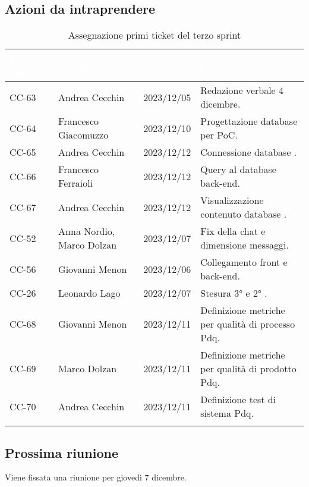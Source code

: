 \subsection{Azioni da intraprendere}
{
    \setlength{\tabcolsep}{10pt}
            \renewcommand{\arraystretch}{1.5}
            \begin{xltabular}{\textwidth}{| l | X | l | X |}
                 \hline
                 \textbf{\textcolor{white}{Codice issue}} & \textbf{\textcolor{white}{Assegnatario}} & \textbf{\textcolor{white}{Scadenza}} & \textbf{\textcolor{white}{Descrizione}} \\
                 \hline
                 \endhead
                 CC-63 & Andrea Cecchin & 2023/12/05 & Redazione verbale 4 dicembre. \\
                 \hline
                 CC-64 & Francesco Giacomuzzo & 2023/12/10 & Progettazione database per PoC. \\
                 \hline
                 CC-65 & Andrea Cecchin & 2023/12/12 & Connessione database . \\
                 \hline
                 CC-66 & Francesco Ferraioli & 2023/12/12 & Query al database back-end. \\
                 \hline
                 CC-67 & Andrea Cecchin & 2023/12/12 & Visualizzazione contenuto database . \\
                 \hline
                 CC-52 & Anna Nordio, Marco Dolzan& 2023/12/07 & Fix della chat e dimensione messaggi. \\
                 \hline
                 CC-56 & Giovanni Menon & 2023/12/06 & Collegamento front e back-end. \\
                 \hline
                 CC-26 & Leonardo Lago & 2023/12/07 & Stesura 3°  e 2° . \\
                 \hline
                 CC-68 & Giovanni Menon & 2023/12/11 & Definizione metriche per qualità di processo Pdq. \\
                 \hline
                 CC-69 & Marco Dolzan & 2023/12/11 & Definizione metriche per qualità di prodotto Pdq. \\
                 \hline
                 CC-70 & Andrea Cecchin & 2023/12/11 & Definizione test di sistema Pdq. \\
                 \hline
                  \caption{Assegnazione primi ticket del terzo sprint}
            \end{xltabular}
}


\subsection{Prossima riunione} \label{subsec:riunione}
Viene fissata una riunione per giovedì 7 dicembre.